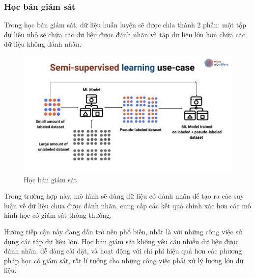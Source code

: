 \subsubsection{Học bán giám sát}
Trong học bán giám sát, dữ liệu huấn luyện sẽ được chia thành 2 phần: một tập dữ liệu nhỏ sẽ chứa các dữ liệu được đánh nhãn và tập dữ liệu lớn hơn chứa các dữ liệu không đánh nhãn.
\begin{figure}[htb]
    \centering
    \includegraphics[width=\textwidth]{image/semi-supervised-learning.jpeg}
    \caption[Học bán giám sát]{Học bán giám sát\footnotemark}
    \label{figure:semi-supervised-learning}
\end{figure}

Trong trường hợp này, mô hình sẽ dùng dữ liệu có đánh nhãn để tạo ra các suy luận về dữ liệu chưa được đánh nhãn, cung cấp các kết quả chính xác hơn các mô hình học có giám sát thông thường.

Hướng tiếp cận này đang dần trở nên phổ biến, nhất là với những công việc sử dụng các tập dữ liệu lớn. Học bán giám sát không yêu cầu nhiều dữ liệu được đánh nhãn, dễ dàng cài đặt, và hoạt động với chi phí hiệu quả hơn các phương pháp học có giám sát, rất lí tưởng cho những công việc phải xử lý lượng lớn dữ liệu.\cite{webpage}

